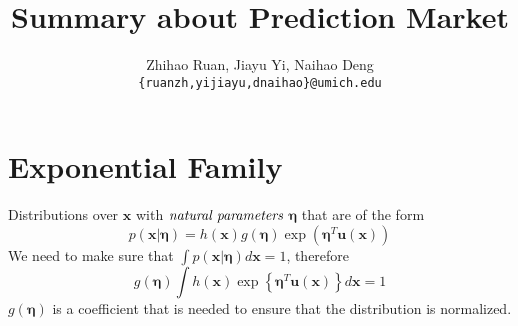 \documentclass[12pt]{article}
\title{\textbf{Summary about Prediction Market}}
\author{Zhihao Ruan, Jiayu Yi, Naihao Deng\\\texttt{\{ruanzh,yijiayu,dnaihao\}@umich.edu}}
\begin{document}
\maketitle
\tableofcontents


\newpage
\section{Exponential Family}
Distributions over $\mathbf{x}$ with $\emph{natural parameters}$ $\bm{\eta}$ that are of the form
\begin{equation}\label{eq:expo_fam}
    p(\mathbf{x}|\bm{\eta})=h(\mathbf{x})g(\bm{\eta})\exp(\bm{\eta}^T\mathbf{u}(\mathbf{x}))
\end{equation}
We need to make sure that
$\int{p(\mathbf{x}|\bm{\eta})}d\bm{x}=1$, therefore
\begin{equation}\label{eq:normalize}
    g(\bm{\eta})\int{h(\mathbf{x})\exp\left\{\bm{\eta}^T\mathbf{u}(\mathbf{x})\right\}}d\mathbf{x}=1
\end{equation}
$g(\bm{\eta})$ is a coefficient that is needed to ensure that the distribution is normalized.
\end{document}
